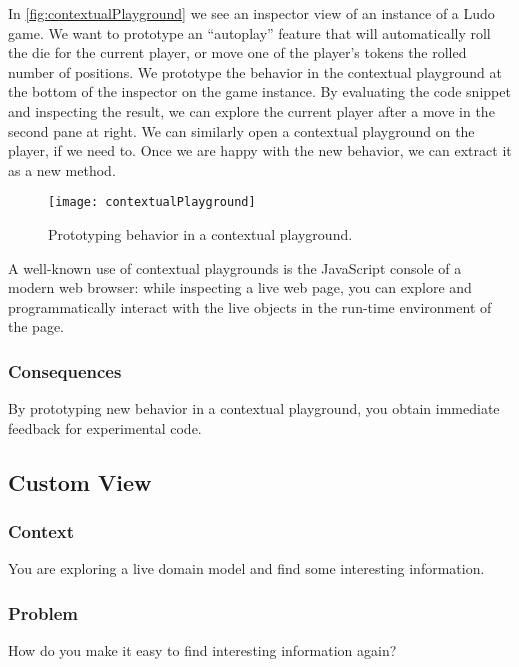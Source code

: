 \documentclass[sigconf]{acmart}
\begin{document}
In \autoref{fig:contextualPlayground} we see an inspector view of an instance of a Ludo game.
We want to prototype an ``autoplay'' feature that will automatically roll the die for the current player, or move one of the player's tokens the rolled number of positions.
We prototype the behavior in the contextual playground at the bottom of the inspector on the game instance.
By evaluating the code snippet and inspecting the result, we can explore the current player after a move in the second pane at right.
We can similarly open a contextual playground on the player, if we need to.
Once we are happy with the new behavior, we can extract it as a new method.

\begin{figure}[h]
  \texttt{[image: contextualPlayground]}
  \caption{Prototyping behavior in a contextual playground.}
  \label{fig:contextualPlayground}
\end{figure}

A well-known use of contextual playgrounds is the JavaScript console of a modern web browser: while inspecting a live web page, you can explore and programmatically interact with the live objects in the run-time environment of the page.

\subsubsection*{Consequences}
By prototyping new behavior in a contextual playground, you obtain immediate feedback for experimental code.

\subsection*{Custom View}\label{pat:customView}
\subsubsection*{Context}
You are exploring a live domain model and find some interesting information.

\subsubsection*{Problem}
How do you make it easy to find interesting information again?
\end{document}
